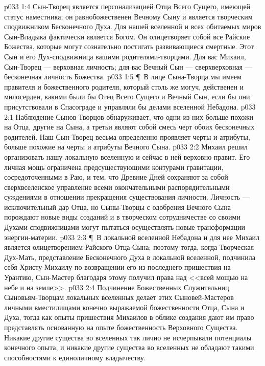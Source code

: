 \vs p033 1:4 Сын\hyp{}Творец является персонализацией Отца Всего Сущего, имеющей статус наместника; он равнобожественен Вечному Сыну и является творческим сподвижником Бесконечного Духа. Для нашей вселенной и всех обитаемых миров Сын\hyp{}Владыка фактически является Богом. Он олицетворяет собой все Райские Божества, которые могут сознательно постигать развивающиеся смертные. Этот Сын и его Дух\hyp{}сподвижница  вашими родителями\hyp{}творцами. Для вас Михаил, Сын\hyp{}Творец --- верховная личность; для вас Вечный Сын --- сверхверховная --- бесконечная личность Божества.
\vs p033 1:5 \P\ В лице Сына\hyp{}Творца мы имеем правителя и божественного родителя, который столь же могуч, действенен и милосерден, какими были бы Отец Всего Сущего и Вечный Сын, если бы они присутствовали в Спасограде и управляли бы делами вселенной Небадона.
\vs p033 2:1 Наблюдение Сынов\hyp{}Творцов обнаруживает, что одни из них больше похожи на Отца, другие на Сына, а третьи являют собой смесь черт обоих бесконечных родителей. Наш Сын\hyp{}Творец весьма определенно проявляет черты и атрибуты, больше похожие на черты и атрибуты Вечного Сына.
\vs p033 2:2 Михаил решил организовать нашу локальную вселенную и сейчас в ней верховно правит. Его личная мощь ограничена предсуществующими контурами гравитации, сосредоточенными в Раю, и тем, что Древние Дней сохраняют за собой сверхвселенское управление всеми окончательными распорядительными суждениями в отношении прекращения существования личности. Личность --- исключительный дар Отца, но Сыны\hyp{}Творцы с одобрения Вечного Сына порождают новые виды созданий и в творческом сотрудничестве со своими Духами\hyp{}сподвижницами могут пытаться осуществлять новые трансформации энергии\hyp{}материи.
\vs p033 2:3 \P\ В локальной вселенной Небадона и для нее Михаил является олицетворением Райского Отца\hyp{}Сына; поэтому тогда, когда Творческая Дух\hyp{}Мать, представление Бесконечного Духа в локальной вселенной, подчинила себя Христу\hyp{}Михаилу по возвращении его из последнего пришествия на Урантию, Сын\hyp{}Мастер благодаря этому получил права над <<всей мощью на небе и на земле>>.
\vs p033 2:4 Подчинение Божественных Служительниц Сыновьям\hyp{}Творцам локальных вселенных делает этих Сыновей\hyp{}Мастеров личными вместилищами конечно выражаемой божественности Отца, Сына и Духа, тогда как опыты пришествия Михаилов в облике создания дают им право представлять основанную на опыте божественность Верховного Существа. Никакие другие существа во вселенных так лично не исчерпывали потенциалы конечного опыта, и никакие другие существа во вселенных не обладают такими способностями к единоличному владычеству.
